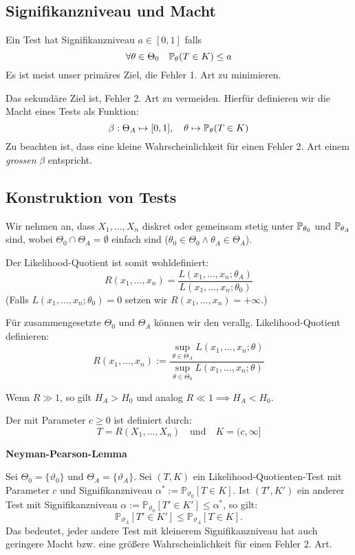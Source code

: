 \subsection{Signifikanzniveau und Macht}
Ein Test hat Signifikanzniveau \(a \in [0,1]\) falls
\[\forall \theta \in \Theta_0 \quad \P_\theta(T \in K) \le a\]
Es ist meist unser primäres Ziel, die Fehler 1. Art zu minimieren.

Das sekundäre Ziel ist, Fehler 2. Art zu vermeiden. Hierfür definieren wir die Macht eines Tests als Funktion:
\[\beta : \Theta_A \mapsto [0,1], \quad \theta \mapsto \P_\theta(T \in K)\]
Zu beachten ist, dass eine kleine Wahrscheinlichkeit für einen Fehler 2. Art einem \textit{grossen} \(\beta\) entspricht.

\subsection{Konstruktion von Tests}
Wir nehmen an, dass \(X_1, \ldots, X_n\) diskret oder gemeinsam stetig unter \(\P_{\theta_0}\) und \(\P_{\theta_A}\) sind, wobei \(\Theta_0 \cap \Theta_A = \emptyset\) einfach sind (\(\theta_0 \in \Theta_0 \land \theta_A \in \Theta_A\)).

\noindent Der Likelihood-Quotient ist somit wohldefiniert:
\[R(x_1, \ldots, x_n) = \frac{L(x_1,\ldots, x_n;\theta_A)}{L(x_1, \ldots, x_n;\theta_0)}\]
(Falls \(L(x_1, \ldots, x_n; \theta_0) = 0\) setzen wir \(R(x_1, \ldots, x_n) = +\infty\).) 

Für zusammengesetzte $\Theta_0$ und $\Theta_A$ können wir den verallg. Likelihood-Quotient definieren:
\[R(x_1, ..., x_n) := \frac{\sup_{\theta \in \Theta_A}L(x_1, \dots, x_n; \theta)}{\sup_{\theta \in \Theta_0}L(x_1, \dots, x_n; \theta)}\]


Wenn \(R \gg 1\), so gilt \(H_A > H_0\) und analog \(R \ll 1 \implies H_A < H_0\).

\begin{subbox}{}
	Der  mit Parameter \(c \ge 0\) ist definiert durch:
	\[T = R(X_1, \ldots, X_n) \quad \text{und} \quad K = (c, \infty]\]
\end{subbox}
\textbf{Neyman-Pearson-Lemma}

Sei $\Theta_0=\{\vartheta_0\}$ und $\Theta_A=\{\vartheta_A\}$. Sei $(T, K)$ ein Likelihood-Quotienten-Test mit Parameter $c$ und Signifikanzniveau $\alpha^* := \mathbb{P}_{\vartheta_0}[T \in K]$. Ist $(T', K')$ ein anderer Test mit Signifikanzniveau $\alpha := \mathbb{P}_{\vartheta_0}[T' \in K'] \leq \alpha^*$, so gilt:
$$
\mathbb{P}_{\vartheta_A}[T' \in K'] \leq \mathbb{P}_{\vartheta_A}[T \in K].
$$
Das bedeutet, jeder andere Test mit kleinerem Signifikanzniveau hat auch geringere Macht bzw. eine größere Wahrscheinlichkeit für einen Fehler 2. Art.

